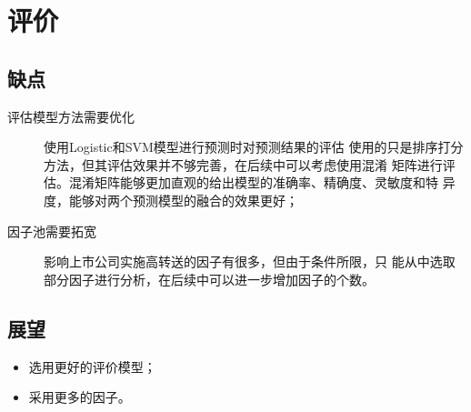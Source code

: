 \documentclass[../main]{subfiles}
\begin{document}
\chapter{评价}%
\label{cha:evaluate}

\section{缺点}%
\label{sec:weakness}

\begin{description}
  \item[评估模型方法需要优化]使用Logistic和SVM模型进行预测时对预测结果的评估
    使用的只是排序打分方法，但其评估效果并不够完善，在后续中可以考虑使用混淆
    矩阵进行评估。混淆矩阵能够更加直观的给出模型的准确率、精确度、灵敏度和特
    异度，能够对两个预测模型的融合的效果更好；
  \item[因子池需要拓宽]影响上市公司实施高转送的因子有很多，但由于条件所限，只
    能从中选取部分因子进行分析，在后续中可以进一步增加因子的个数。
\end{description}

\section{展望}%
\label{sec:vista}

\begin{itemize}
  \item 选用更好的评价模型；
  \item 采用更多的因子。
\end{itemize}
\end{document}
